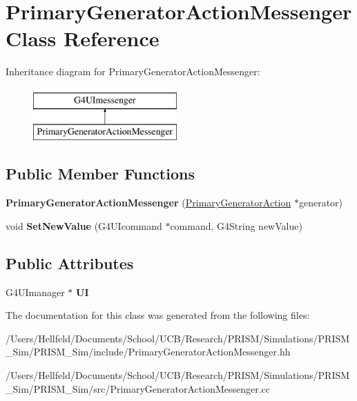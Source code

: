 \hypertarget{class_primary_generator_action_messenger}{}\section{Primary\+Generator\+Action\+Messenger Class Reference}
\label{class_primary_generator_action_messenger}
Inheritance diagram for Primary\+Generator\+Action\+Messenger\+:\begin{figure}[H]
\begin{center}
\leavevmode
\includegraphics[height=2.000000cm]{class_primary_generator_action_messenger}
\end{center}
\end{figure}
\subsection*{Public Member Functions}
\begin{DoxyCompactItemize}
\item 
\hypertarget{class_primary_generator_action_messenger_ac5f26313e6a6232eb571ac20478ab49e}{}\label{class_primary_generator_action_messenger_ac5f26313e6a6232eb571ac20478ab49e} 
{\bfseries Primary\+Generator\+Action\+Messenger} (\hyperlink{class_primary_generator_action}{Primary\+Generator\+Action} $\ast$generator)
\item 
\hypertarget{class_primary_generator_action_messenger_a7f070eee4e7b9f8a38ea1f82147feaf4}{}\label{class_primary_generator_action_messenger_a7f070eee4e7b9f8a38ea1f82147feaf4} 
void {\bfseries Set\+New\+Value} (G4\+U\+Icommand $\ast$command, G4\+String new\+Value)
\end{DoxyCompactItemize}
\subsection*{Public Attributes}
\begin{DoxyCompactItemize}
\item 
\hypertarget{class_primary_generator_action_messenger_a7f555ea25f9f58b8d6cd706979216c02}{}\label{class_primary_generator_action_messenger_a7f555ea25f9f58b8d6cd706979216c02} 
G4\+U\+Imanager $\ast$ {\bfseries UI}
\end{DoxyCompactItemize}


The documentation for this class was generated from the following files\+:\begin{DoxyCompactItemize}
\item 
/\+Users/\+Hellfeld/\+Documents/\+School/\+U\+C\+B/\+Research/\+P\+R\+I\+S\+M/\+Simulations/\+P\+R\+I\+S\+M\+\_\+\+Sim/\+P\+R\+I\+S\+M\+\_\+\+Sim/include/Primary\+Generator\+Action\+Messenger.\+hh\item 
/\+Users/\+Hellfeld/\+Documents/\+School/\+U\+C\+B/\+Research/\+P\+R\+I\+S\+M/\+Simulations/\+P\+R\+I\+S\+M\+\_\+\+Sim/\+P\+R\+I\+S\+M\+\_\+\+Sim/src/Primary\+Generator\+Action\+Messenger.\+cc\end{DoxyCompactItemize}
